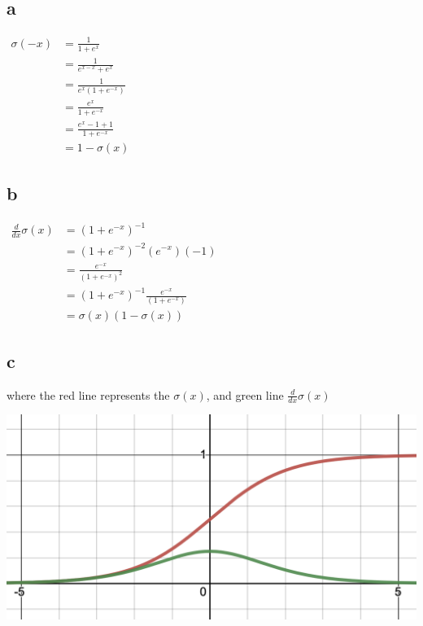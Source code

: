 \documentclass[12pt]{article}
\begin{document}
\subsection*{a}
\begin{center}
    $
        \begin{alignedat}{2}
            \sigma(-x) & =\frac{1}{1+e^x}           \\
                       & = \frac{1}{e^{x-x}+e^x}    \\
                       & = \frac{1}{e^x(1+e^{-x})}  \\
                       & = \frac{e^x}{1+e^{-x}}     \\
                       & = \frac{e^x-1+1}{1+e^{-x}} \\
                       & = 1 - \sigma(x)
        \end{alignedat}
    $
\end{center}

\subsection*{b}
\begin{center}
    $
        \begin{alignedat}{1}
            \frac{d }{dx} \sigma(x) & = (1+e^{-x})^{-1}                           \\
                                    & = (1+e^{-x})^{-2}(e^{-x})(-1)               \\
                                    & = \frac{e^{-x}}{(1+e^{-x})^{2}}             \\
                                    & = (1+e^{-x})^{-1} \frac{e^{-x}}{(1+e^{-x})} \\
                                    & = \sigma (x) (1-\sigma(x))
        \end{alignedat}
    $
\end{center}

\newpage

\subsection*{c}
where the red line represents the $\sigma(x)$, and green line $\frac{d }{dx} \sigma(x)$

\includegraphics[width=\textwidth]{question2.png}
\end{document}
